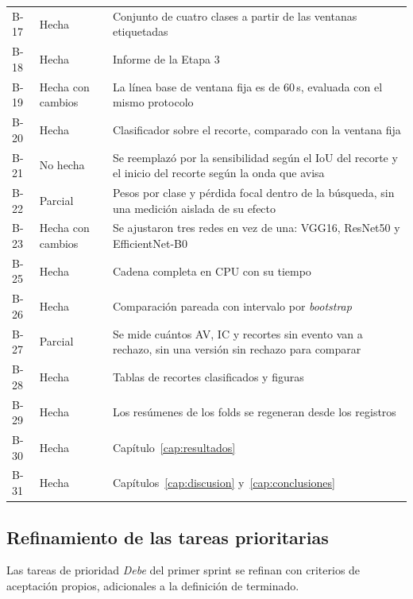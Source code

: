{\begin{longtable}{>{\raggedright\arraybackslash}p{1.1cm}>{\raggedright\arraybackslash}p{2.3cm}>{\raggedright\arraybackslash}p{9.0cm}}
B-17 & Hecha & Conjunto de cuatro clases a partir de las ventanas etiquetadas \\
B-18 & Hecha & Informe de la Etapa 3 \\
B-19 & Hecha con cambios & La línea base de ventana fija es de 60\,s, evaluada
con el mismo protocolo \\
B-20 & Hecha & Clasificador sobre el recorte, comparado con la ventana fija \\
B-21 & No hecha & Se reemplazó por la sensibilidad según el IoU del recorte y
el inicio del recorte según la onda que avisa \\
B-22 & Parcial & Pesos por clase y pérdida focal dentro de la búsqueda, sin
una medición aislada de su efecto \\
B-23 & Hecha con cambios & Se ajustaron tres redes en vez de una: VGG16,
ResNet50 y EfficientNet-B0 \\
B-25 & Hecha & Cadena completa en CPU con su tiempo \\
B-26 & Hecha & Comparación pareada con intervalo por \emph{bootstrap} \\
B-27 & Parcial & Se mide cuántos AV, IC y recortes sin evento van a rechazo,
sin una versión sin rechazo para comparar \\
B-28 & Hecha & Tablas de recortes clasificados y figuras \\
B-29 & Hecha & Los resúmenes de los folds se regeneran desde los registros \\
B-30 & Hecha & Capítulo~\ref{cap:resultados} \\
B-31 & Hecha & Capítulos~\ref{cap:discusion} y~\ref{cap:conclusiones} \\
\end{longtable}
}

\subsection{Refinamiento de las tareas prioritarias}
\label{sec:anexo-refinamiento}

Las tareas de prioridad \emph{Debe} del primer sprint se refinan con criterios de
aceptación propios, adicionales a la definición de terminado.

